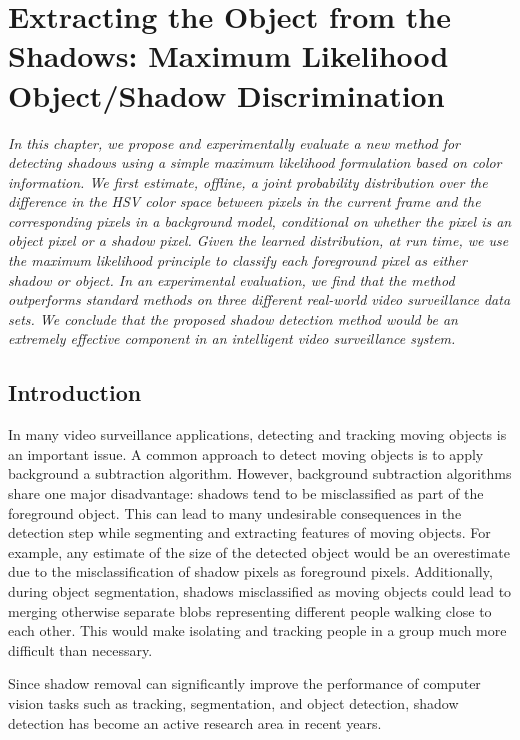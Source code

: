 \setlength{\footskip}{8mm}

\chapter{Extracting the Object from the Shadows: Maximum Likelihood
Object/Shadow Discrimination}
\label{ch:shadow}

\textit{In this chapter, we propose and experimentally evaluate a new
method for detecting shadows using a simple maximum likelihood
formulation based on color information. We first estimate, offline, a
joint probability distribution over the difference in the HSV color
space between pixels in the current frame and the corresponding pixels
in a background model, conditional on whether the pixel is an object
pixel or a shadow pixel.  Given the learned distribution, at run time,
we use the maximum likelihood principle to classify each foreground
pixel as either shadow or object.  In an experimental evaluation, we
find that the method outperforms standard methods on three different
real-world video surveillance data sets.  We conclude that the
proposed shadow detection method would be an extremely effective
component in an intelligent video surveillance system.}

\section{Introduction}

In many video surveillance applications, detecting and tracking moving
objects is an important issue. A common approach to detect moving
objects is to apply background a subtraction algorithm. However,
background subtraction algorithms share one major disadvantage:
shadows tend to be misclassified as part of the foreground
object. This can lead to many undesirable consequences in the
detection step while segmenting and extracting features of moving
objects. For example, any estimate of the size of the detected object
would be an overestimate due to the misclassification of shadow pixels
as foreground pixels. Additionally, during object segmentation,
shadows misclassified as moving objects could lead to merging
otherwise separate blobs representing different people walking close
to each other.  This would make isolating and tracking people in a
group much more difficult than necessary.

Since shadow removal can significantly improve the performance of
computer vision tasks such as tracking, segmentation, and object
detection, shadow detection has become an active research area in
recent years.

